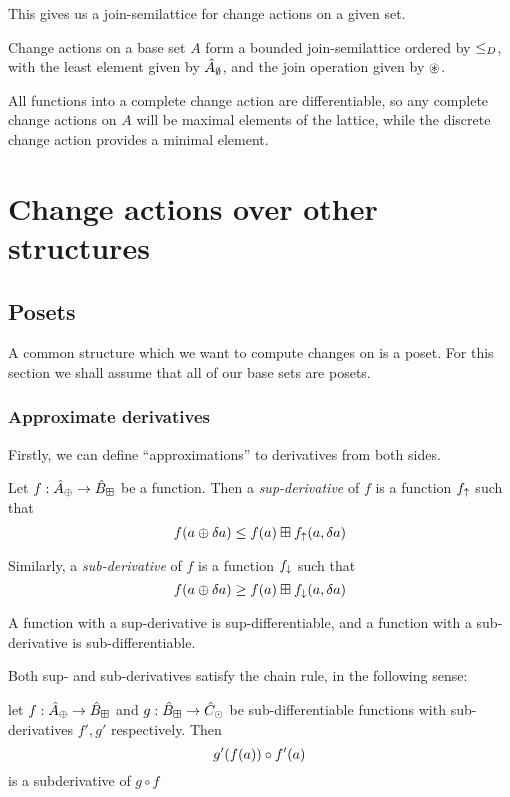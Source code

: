 This gives us a join-semilattice for change actions on a given set.

\begin{thm}
  Change actions on a base set $A$ form a bounded join-semilattice 
  ordered by $\leq_D$, with the least element given by
  $\hat{A}_\emptyset$, and the join operation given by $\circledast$.
\end{thm}

All functions into a complete change action are differentiable, so any
complete change actions on $A$ will be maximal elements of the lattice, while
the discrete change action provides a minimal element.

\section{Change actions over other structures}
\label{sec:moreStructures}

\subsection{Posets}

A common structure which we want to compute changes on is a poset. For this
section we shall assume that all of our base sets are posets.

\subsubsection{Approximate derivatives}

Firstly, we can define ``approximations'' to derivatives from both sides.

\begin{defn}
  Let $f: \hat{A}_\oplus \rightarrow \hat{B}_\boxplus$ be a function. Then a \textit{sup-derivative}
  of $f$ is a function $f_\uparrow$ such that
  $$f(a \oplus \delta a) \leq f(a) \boxplus f_\uparrow(a, \delta a)$$
  
  Similarly, a \textit{sub-derivative} of $f$ is a function $f_\downarrow$ such that 
  $$f(a \oplus \delta a) \geq f(a) \boxplus f_\downarrow(a, \delta a)$$

  A function with a sup-derivative is sup-differentiable, and a function with a
  sub-derivative is sub-differentiable.
\end{defn}

Both sup- and sub-derivatives satisfy the chain rule, in the following sense: 
\begin{prop}
  let $f : \hat{A}_\oplus \rightarrow \hat{B}_\boxplus$ and $g : \hat{B}_\boxplus \rightarrow \hat{C}_\odot$ be
  sub-differentiable functions with sub-derivatives $f', g'$ respectively. Then
  $$g'(f(a)) \circ f'(a)$$ is a subderivative of $g \circ f$
\end{prop}

